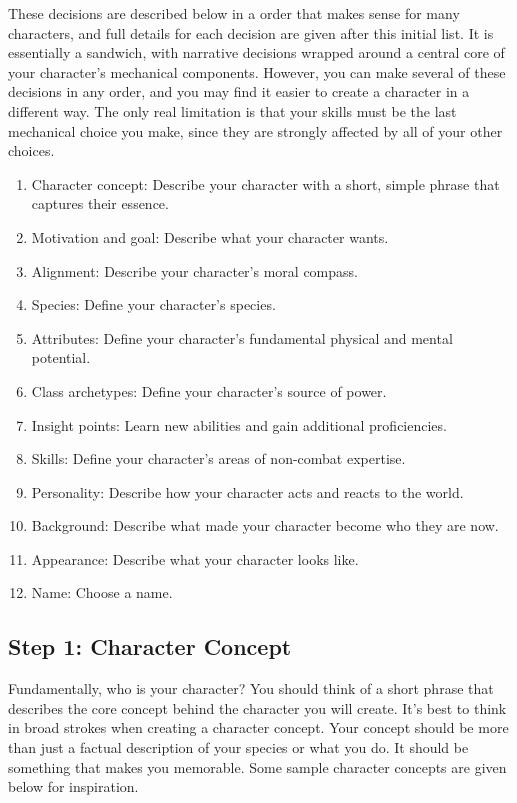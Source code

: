     These decisions are described below in a order that makes sense for many characters, and full details for each decision are given after this initial list.
    It is essentially a sandwich, with narrative decisions wrapped around a central core of your character's mechanical components.
    However, you can make several of these decisions in any order, and you may find it easier to create a character in a different way.
    The only real limitation is that your skills must be the last mechanical choice you make, since they are strongly affected by all of your other choices.

    \begin{enumerate}
        \item Character concept: Describe your character with a short, simple phrase that captures their essence.
        \item Motivation and goal: Describe what your character wants.
        \item Alignment: Describe your character's moral compass.

        \item Species: Define your character's species.
        \item Attributes: Define your character's fundamental physical and mental potential.
        \item Class archetypes: Define your character's source of power.
        \item Insight points: Learn new abilities and gain additional proficiencies.
        \item Skills: Define your character's areas of non-combat expertise.

        \item Personality: Describe how your character acts and reacts to the world.
        \item Background: Describe what made your character become who they are now.
        \item Appearance: Describe what your character looks like.
        \item Name: Choose a name.
    \end{enumerate}

    \subsection{Step 1: Character Concept}

        Fundamentally, who is your character?
        You should think of a short phrase that describes the core concept behind the character you will create.
        It's best to think in broad strokes when creating a character concept.
        Your concept should be more than just a factual description of your species or what you do.
        It should be something that makes you memorable.
        Some sample character concepts are given below for inspiration.

